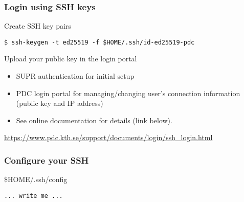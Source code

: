 \begin{frame}[fragile]
\frametitle{Login using SSH keys}

\begin{block}{Create SSH key pairs}
\begin{verbatim}
$ ssh-keygen -t ed25519 -f $HOME/.ssh/id-ed25519-pdc
\end{verbatim}
\end{block}

\begin{block}{Upload your public key in the login portal}
    \begin{itemize}
        \item SUPR authentication for initial setup
        \item PDC login portal for managing/changing user’s connection information (public key and IP address)
        \item See online documentation for details (link below).
    \end{itemize}
\end{block}

\href{https://www.pdc.kth.se/support/documents/login/ssh\_login.html}{https://www.pdc.kth.se/support/documents/login/ssh\_login.html}

\end{frame}


\begin{frame}[fragile]
\frametitle{Configure your SSH}

\begin{block}{\$HOME/.ssh/config}
\begin{verbatim}
... write me ...
\end{verbatim}
\end{block}

\end{frame}
